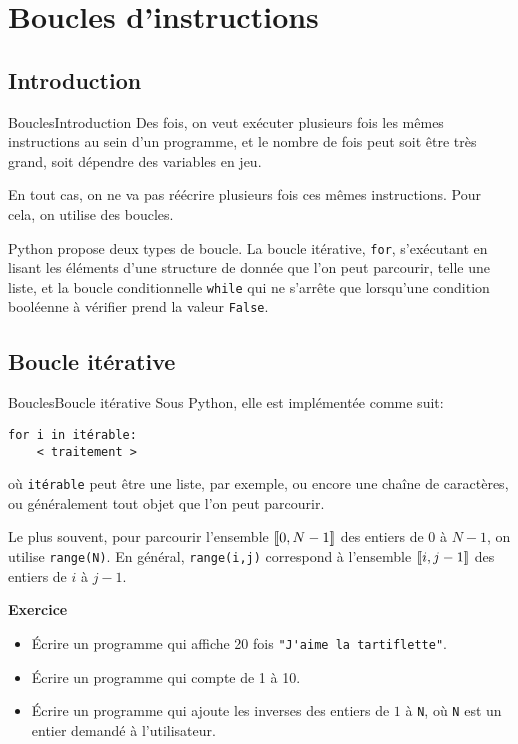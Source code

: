 \documentclass[10pt,xcolor={dvipsnames}]{beamer}
\DeclarePairedDelimiter{\intcc}{[\![}{]\!]}
\newcounter{Exercice}
\newenvironment{exo}{
	\refstepcounter{Exercice}
	\begin{block}{\textbf{Exercice~\theExercice}}
}{\end{block}}
\begin{document}
\section{Boucles d'instructions}
\subsection{Introduction}

\begin{frame}[fragile]{Boucles}{Introduction}
	Des fois, on veut exécuter plusieurs fois les mêmes instructions au sein d'un programme, et le nombre de fois peut soit être très grand, soit dépendre des variables en jeu.
	\pause
	
	En tout cas, on ne va pas réécrire plusieurs fois ces mêmes instructions. Pour cela, on utilise des boucles.
	\pause
	
	Python propose deux types de boucle. La boucle itérative, \lstinline|for|, s'exécutant en lisant les éléments d'une structure de donnée que l'on peut parcourir, telle une liste, et la boucle conditionnelle \lstinline|while| qui ne s'arrête que lorsqu'une condition booléenne à vérifier prend la valeur \lstinline|False|.
\end{frame}

\subsection{Boucle itérative}

\begin{frame}[fragile]{Boucles}{Boucle itérative}
Sous Python, elle est implémentée comme suit:
\begin{lstlisting}
for i in itérable:
    < traitement >
\end{lstlisting}
où \lstinline|itérable| peut être une liste, par exemple, ou encore une chaîne de caractères, ou généralement tout objet que l'on peut parcourir.
\pause

Le plus souvent, pour parcourir l'ensemble $\intcc{0,N-1}$ des entiers de $0$ à $N-1$, on utilise \lstinline|range(N)|. En général, \lstinline|range(i,j)| correspond à l'ensemble $\intcc{i,j-1}$ des entiers de $i$ à $j-1$.
\pause

	\begin{exo}
		\begin{itemize}[<+->]
		\item Écrire un programme qui affiche 20 fois \lstinline|"J'aime la tartiflette"|.
		
		\item Écrire un programme qui compte de 1 à 10.
		
		\item Écrire un programme qui ajoute les inverses des entiers de $1$ à \lstinline|N|, où \lstinline|N| est un entier demandé à l'utilisateur.
		\end{itemize}
	\end{exo}
\end{frame}
\end{document}
